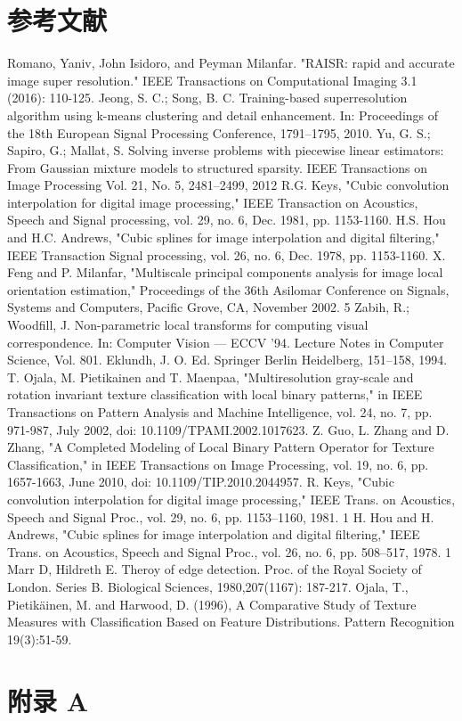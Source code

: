 \documentclass[12pt, a4paper, oneside]{ctexbook}
\begin{document}
	\chapter*{参考文献}
	\begin{thebibliography}{99}
		Romano, Yaniv, John Isidoro, and Peyman Milanfar. "RAISR: rapid and accurate image super resolution." IEEE Transactions on Computational Imaging 3.1 (2016): 110-125.
		Jeong, S. C.; Song, B. C. Training-based superresolution algorithm using k-means clustering and detail enhancement. In: Proceedings of the 18th European Signal Processing Conference, 1791–1795, 2010.
		 Yu, G. S.; Sapiro, G.; Mallat, S. Solving inverse problems with piecewise linear estimators: From Gaussian mixture models to structured sparsity. IEEE Transactions on Image Processing Vol. 21, No. 5, 2481–2499, 2012
		R.G. Keys, "Cubic convolution interpolation for digital image processing," IEEE Transaction on Acoustics, Speech and Signal processing, vol. 29, no. 6, Dec. 1981, pp. 1153-1160.
		H.S. Hou and H.C. Andrews, "Cubic splines for image interpolation and digital filtering," IEEE Transaction Signal processing, vol. 26, no. 6, Dec. 1978, pp. 1153-1160.
		X. Feng and P. Milanfar, "Multiscale principal components analysis for image local orientation estimation," Proceedings of the 36th Asilomar Conference on Signals, Systems and Computers, Pacific Grove, CA, November 2002. 5
		Zabih, R.; Woodfill, J. Non-parametric local transforms for computing visual correspondence. In: Computer Vision — ECCV '94. Lecture Notes in Computer Science, Vol. 801. Eklundh, J. O. Ed. Springer Berlin Heidelberg, 151–158, 1994.
		T. Ojala, M. Pietikainen and T. Maenpaa, "Multiresolution gray-scale and rotation invariant texture classification with local binary patterns," in IEEE Transactions on Pattern Analysis and Machine Intelligence, vol. 24, no. 7, pp. 971-987, July 2002, doi: 10.1109/TPAMI.2002.1017623.
		Z. Guo, L. Zhang and D. Zhang, "A Completed Modeling of Local Binary Pattern Operator for Texture Classification," in IEEE Transactions on Image Processing, vol. 19, no. 6, pp. 1657-1663, June 2010, doi: 10.1109/TIP.2010.2044957.
		 R. Keys, "Cubic convolution interpolation for digital image processing," IEEE Trans. on Acoustics, Speech and Signal Proc., vol. 29, no. 6, pp. 1153–1160, 1981. 1
		H. Hou and H. Andrews, "Cubic splines for image interpolation and digital filtering," IEEE Trans. on Acoustics, Speech and Signal Proc., vol. 26, no. 6, pp. 508–517, 1978. 1
		Marr D, Hildreth E. Theroy of edge detection. Proc. of the Royal Society of London. Series B. Biological Sciences, 1980,207(1167): 187-217.
		Ojala, T., Pietikäinen, M. and Harwood, D. (1996), A Comparative Study of Texture Measures with Classification Based on Feature Distributions. Pattern Recognition 19(3):51-59.
	\end{thebibliography}

	\chapter*{附录 A} \label{appendix_a}
	
	
\end{document}

